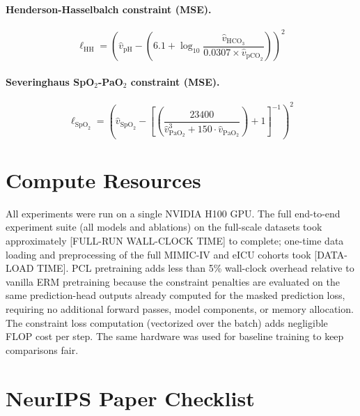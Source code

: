 \documentclass{article}
\begin{document}
\paragraph{Henderson-Hasselbalch constraint (MSE).}
\begin{equation}
\ell_{\text{HH}} = \left(\hat{v}_{\text{pH}} - \left(6.1 + \log_{10}\frac{\hat{v}_{\text{HCO}_3}}{0.0307 \times \hat{v}_{\text{pCO}_2}}\right)\right)^2
\end{equation}

\paragraph{Severinghaus SpO$_2$-PaO$_2$ constraint (MSE).}
\begin{equation}
\ell_{\text{SpO}_2} = \left(\hat{v}_{\text{SpO}_2} - \left[\left(\frac{23400}{\hat{v}_{\text{PaO}_2}^3 + 150 \cdot \hat{v}_{\text{PaO}_2}}\right) + 1\right]^{-1}\right)^2
\end{equation}

\section{Compute Resources}
\label{app:compute}

All experiments were run on a single NVIDIA H100 GPU. The full end-to-end experiment suite (all models and ablations) on the full-scale datasets took approximately [FULL-RUN WALL-CLOCK TIME] to complete; one-time data loading and preprocessing of the full MIMIC-IV and eICU cohorts took [DATA-LOAD TIME]. PCL pretraining adds less than 5\% wall-clock overhead relative to vanilla ERM pretraining because the constraint penalties are evaluated on the same prediction-head outputs already computed for the masked prediction loss, requiring no additional forward passes, model components, or memory allocation.
The constraint loss computation (vectorized over the batch) adds negligible FLOP cost per step. The same hardware was used for baseline training to keep comparisons fair.


\newpage
\section*{NeurIPS Paper Checklist}
\end{document}
